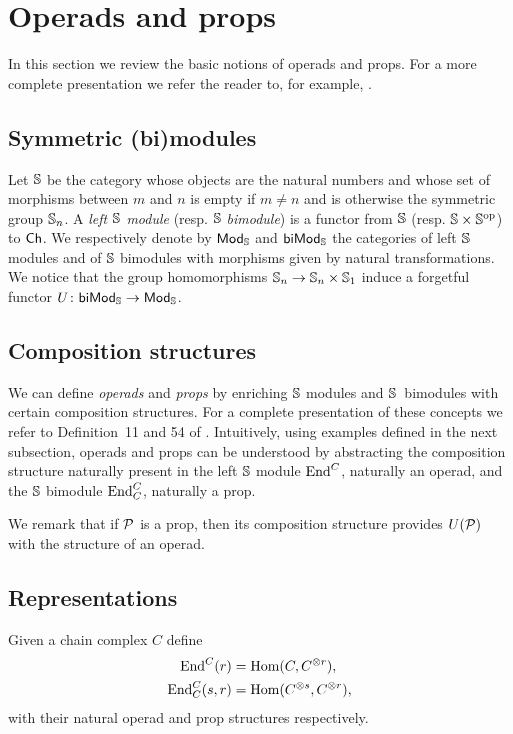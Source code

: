 
\section{Operads and props} \label{s:operads and props}

In this section we review the basic notions of operads and props.
For a more complete presentation we refer the reader to, for example, \cite{markl2008props}.

\subsection{Symmetric (bi)modules}

Let $\S$ be the category whose objects are the natural numbers and whose set of morphisms between $m$ and $n$ is empty if $m \neq n$ and is otherwise the symmetric group $\S_n$.
A \textit{left $\S$ module} (resp. $\S$ \textit{bimodule}) is a functor from $\S$ (resp. $\S \times \S^\op$) to $\Ch$.
We respectively denote by $\smod$ and $\sbimod$ the categories of left $\S$ modules and of $\S$ bimodules with morphisms given by natural transformations.
We notice that the group homomorphisms $\S_n \to \S_n \times \S_1$ induce a forgetful functor $U \colon \sbimod \to \smod$.

\subsection{Composition structures}

We can define \textit{operads} and \textit{props} by enriching $\S$ modules and \mbox{$\S$ bimodules} with certain composition structures.
For a complete presentation of these concepts we refer to Definition~11 and 54 of \cite{markl2008props}.
Intuitively, using examples defined in the next subsection, operads and props can be understood by abstracting the composition structure naturally present in the left $\S$ module $\End^C$, naturally an operad, and the $\S$ bimodule $\End^C_C$, naturally a prop.

We remark that if $\P$ is a prop, then its composition structure provides $U(\P)$ with the structure of an operad.

\subsection{Representations}

Given a chain complex $C$ define
\begin{align*}
\End^C(r) &= \Hom(C, C^{\otimes r}), \\
\End^C_C(s, r) &= \Hom(C^{\otimes s}, C^{\otimes r}),
\end{align*}
with their natural operad and prop structures respectively.

